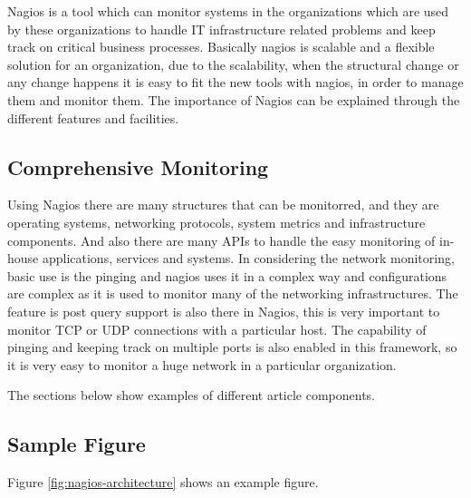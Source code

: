 \documentclass[9pt,twocolumn,twoside]{styles/osajnl}
\begin{document}
Nagios is a tool which can monitor systems in the organizations which are used by these organizations to handle IT infrastructure related problems and keep track on critical business processes.
Basically nagios is scalable and a flexible solution for an organization, due to the scalability, when the structural change or any change happens it is easy to fit the new tools with nagios, in order to manage them and monitor them. The importance of Nagios can be explained through the different features and facilities.

\subsection{Comprehensive Monitoring}

Using Nagios there are many structures that can be monitorred, and they are  operating systems, networking protocols, system metrics and infrastructure components. And also there are many APIs to handle the easy monitoring of in-house applications, services and systems. In considering the network monitoring, basic use is the pinging and nagios uses it in a complex way and configurations are complex as it is used to monitor many of the networking infrastructures. The feature is post query support is also there in Nagios, this is very important to monitor TCP or UDP connections with a particular host. The capability of pinging and keeping track on multiple ports is also enabled in this framework, so it is very easy to monitor a huge network in a particular organization.  



\label{sec:examples}

The sections below show examples of different article components.

\subsection{Sample Figure}

Figure \ref{fig:nagios-architecture} shows an example figure.
\end{document}
